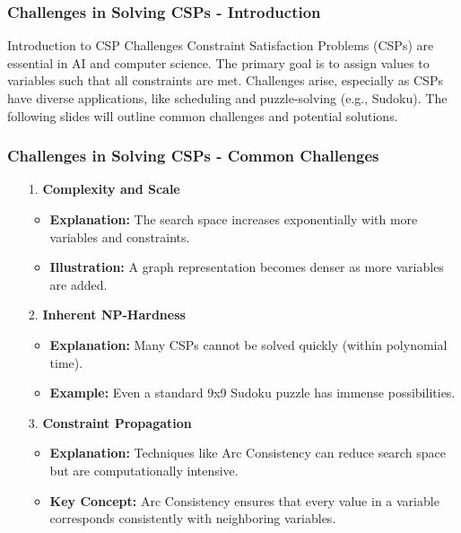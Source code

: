 \documentclass[aspectratio=169]{beamer}
\begin{document}
\begin{frame}[fragile]
    \frametitle{Challenges in Solving CSPs - Introduction}
    \begin{block}{Introduction to CSP Challenges}
        Constraint Satisfaction Problems (CSPs) are essential in AI and computer science. The primary goal is to assign values to variables such that all constraints are met. Challenges arise, especially as CSPs have diverse applications, like scheduling and puzzle-solving (e.g., Sudoku). The following slides will outline common challenges and potential solutions.
    \end{block}
\end{frame}

\begin{frame}[fragile]
    \frametitle{Challenges in Solving CSPs - Common Challenges}
    \begin{enumerate}
        \item[1.] \textbf{Complexity and Scale}
            \begin{itemize}
                \item \textbf{Explanation:} The search space increases exponentially with more variables and constraints.
                \item \textbf{Illustration:} A graph representation becomes denser as more variables are added.
            \end{itemize}
        
        \item[2.] \textbf{Inherent NP-Hardness}
            \begin{itemize}
                \item \textbf{Explanation:} Many CSPs cannot be solved quickly (within polynomial time).
                \item \textbf{Example:} Even a standard 9x9 Sudoku puzzle has immense possibilities.
            \end{itemize}
        
        \item[3.] \textbf{Constraint Propagation}
            \begin{itemize}
                \item \textbf{Explanation:} Techniques like Arc Consistency can reduce search space but are computationally intensive.
                \item \textbf{Key Concept:} Arc Consistency ensures that every value in a variable corresponds consistently with neighboring variables.
            \end{itemize}
    \end{enumerate}
\end{frame}
\end{document}
